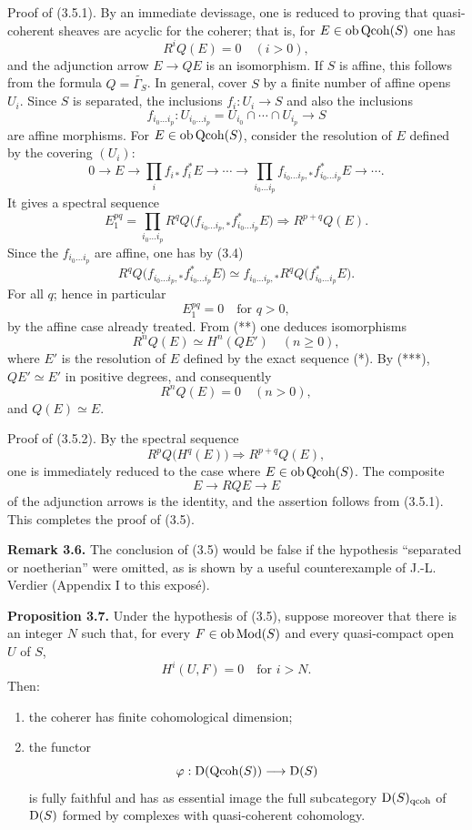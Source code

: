 \documentclass[11pt]{article}
\begin{document}
Proof of (3.5.1). By an immediate devissage, one is reduced to proving that quasi-coherent sheaves are acyclic for the coherer; that is, for $E\in\operatorname{ob}\operatorname{Qcoh}(S)$ one has
\[
R^iQ(E)=0\quad (i>0),
\]
and the adjunction arrow $E\to QE$ is an isomorphism. If $S$ is affine, this follows from the formula $Q=\widetilde{\Gamma_S}$. In general, cover $S$ by a finite number of affine opens $U_i$. Since $S$ is separated, the inclusions $f_i:U_i\to S$ and also the inclusions
\[
f_{i_0\ldots i_p}:U_{i_0\ldots i_p}=U_{i_0}\cap\cdots\cap U_{i_p}\to S
\]
are affine morphisms. For $E\in\operatorname{ob}\operatorname{Qcoh}(S)$, consider the resolution of $E$ defined by the covering $(U_i)$:
\begin{equation}\tag{*}
0\longrightarrow E\longrightarrow \prod_i f_{i*}f_i^*E\longrightarrow\cdots\longrightarrow
\prod_{i_0\ldots i_p} f_{i_0\ldots i_p,*}f_{i_0\ldots i_p}^*E\longrightarrow\cdots.
\end{equation}
It gives a spectral sequence
\begin{equation}\tag{**}
E_1^{pq}=\prod_{i_0\ldots i_p} R^qQ\bigl(f_{i_0\ldots i_p,*}f_{i_0\ldots i_p}^*E\bigr)
\Longrightarrow R^{p+q}Q(E).
\end{equation}
Since the $f_{i_0\ldots i_p}$ are affine, one has by (3.4)
\begin{equation}\tag{***}
R^qQ\bigl(f_{i_0\ldots i_p,*}f_{i_0\ldots i_p}^*E\bigr)
\simeq
f_{i_0\ldots i_p,*} R^qQ\bigl(f_{i_0\ldots i_p}^*E\bigr).
\end{equation}
For all $q$; hence in particular
\[
E_1^{pq}=0\quad\text{for }q>0,
\]
by the affine case already treated. From (**) one deduces isomorphisms
\[
R^nQ(E)\simeq H^n(QE')\quad(n\geq0),
\]
where $E'$ is the resolution of $E$ defined by the exact sequence (*). By (***), $QE'\simeq E'$ in positive degrees, and consequently
\[
R^nQ(E)=0\quad(n>0),
\]
and $Q(E)\simeq E$.

Proof of (3.5.2). By the spectral sequence
\[
R^pQ\bigl(H^q(E)\bigr)\Longrightarrow R^{p+q}Q(E),
\]
one is immediately reduced to the case where $E\in\operatorname{ob}\operatorname{Qcoh}(S)$. The composite
\[
E\longrightarrow RQE\longrightarrow E
\]
of the adjunction arrows is the identity, and the assertion follows from (3.5.1). This completes the proof of (3.5).

\textbf{Remark 3.6.} The conclusion of (3.5) would be false if the hypothesis ``separated or noetherian'' were omitted, as is shown by a useful counterexample of J.-L. Verdier (Appendix I to this exposé).

\textbf{Proposition 3.7.} Under the hypothesis of (3.5), suppose moreover that there is an integer $N$ such that, for every $F\in\operatorname{ob}\operatorname{Mod}(S)$ and every quasi-compact open $U$ of $S$,
\[
H^i(U,F)=0\quad\text{for }i>N.
\]
Then:
\begin{enumerate}[label=\alph*)]
\item the coherer has finite cohomological dimension;
\item the functor
\[
\varphi:\mathrm D(\operatorname{Qcoh}(S))\longrightarrow\mathrm D(S)
\]
is fully faithful and has as essential image the full subcategory $\mathrm D(S)_{\mathrm{qcoh}}$ of $\mathrm D(S)$ formed by complexes with quasi-coherent cohomology.
\end{enumerate}
\end{document}
